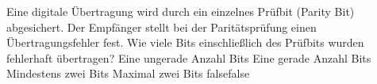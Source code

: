     {Eine digitale Übertragung wird durch ein einzelnes Prüfbit (Parity Bit) abgesichert. Der Empfänger stellt bei der Paritätsprüfung einen Übertragungsfehler fest. Wie viele Bits einschließlich des Prüfbits wurden fehlerhaft übertragen?}
    {Eine ungerade Anzahl Bits}
    {Eine gerade Anzahl Bits}
    {Mindestens zwei Bits}
    {Maximal zwei Bits}
    {false}{false}